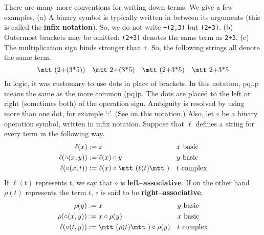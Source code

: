 There are many more conventions for writing down terms. We give a few
examples.  (a) A binary symbol is typically written in between its
arguments (this is called the \textbf{infix notation}).
So, we do not write {\tt +(2,3)} but {\tt (2+3)}. (b) Outermost
brackets may be omitted: {\tt (2+3)} denotes the same term as
{\tt 2+3}. (c) The multiplication sign binds stronger than {\tt +}.
So, the following strings all denote the same term.
\begin{equation}
\mbox{\mtt (2+(3\symbol{42}5))} \quad \mbox{\mtt 2+(3\symbol{42}5)} \quad
\mbox{\mtt (2+3\symbol{42}5)} \quad \mbox{\mtt 2+3\symbol{42}5}
\end{equation}
In logic, it was customary to use dots in place of brackets.
In this notation, {\mtt pq..p} means the same 
as the more common {\mtt (pq)p}. The dots are 
placed to the left or right (sometimes both) of the operation sign. 
Ambiguity is resolved by using more than one dot, for example `{\mtt :}'. 
(See \cite{curry:logic} on this notation.) Also, let $\circ$ 
be a binary operation symbol, written in infix notation. Suppose 
that $\ell$ defines a string for every term in the following way.
\begin{align}
\notag
\ell(x) & := x && \text{$x$ basic} \\
\ell(\circ(x,y)) & := \ell(x) \circ y 
	&& \text{$y$ basic}\\
\notag
\ell(\circ(x,t)) & := \ell(x) \circ \mbox{\mtt (}\ell(t)\mbox{\mtt )} 
	&& \text{$t$ complex}
\end{align}
If $\ell(t)$ represents $t$, we say that $\circ$ is 
\textbf{left--associative}. If on the other hand $\rho(t)$ 
represents the term $t$, $\circ$ is said to be 
\textbf{right--associative}.
\begin{align}
\notag
\rho(y) & := x && \text{$y$ basic} \\
\rho(\circ(x,y)) & := x \circ \rho(y) 
	&& \text{$x$ basic}\\
\notag
\ell(\circ(t,y)) & := \mbox{\mtt (}\rho(t)\mbox{\mtt )} \circ \rho(y)
	&& \text{$t$ complex}
\end{align}


